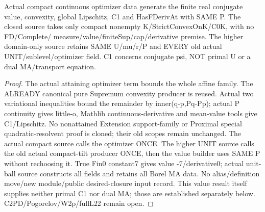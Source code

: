 \begin{lemma}
  \label{lem:compact-conjugate-value}
  \leanok
  Actual compact continuous optimizer data generate the finite real conjugate
  value, convexity, global Lipschitz, C1 and HasFDerivAt with SAME P. The closed
  source takes only compact nonempty K/StrictConvexOnK/C0K, with no FD/Complete/
  measure/value/finiteSup/cap/derivative premise. The higher domain-only source
  retains SAME U/mu/r/P and EVERY old actual UNIT/sublevel/optimizer field.
  C1 concerns conjugate psi, NOT primal U or a dual MA/transport equation.
\end{lemma}
\begin{proof}
  \leanok
  The actual attaining optimizer term bounds the whole affine family. The
  ALREADY canonical pure Supremum convexity producer is reused. Actual two
  variational inequalities bound the remainder by inner(q-p,Pq-Pp); actual P
  continuity gives little-o, Mathlib continuous-derivative and mean-value tools
  give C1/Lipschitz. No nonattained Extension support-family or Proximal special
  quadratic-resolvent proof is cloned; their old scopes remain unchanged.
  The actual compact source calls the optimizer ONCE. The higher UNIT source
  calls the old actual compact-tilt producer ONCE, then the value builder uses
  SAME P without rechoosing it. True Fin0 constant7 gives value -7/derivative0;
  actual unit-ball source constructs all fields and retains all Borel MA data.
  No alias/definition move/new module/public desired-closure input record.
  This value result itself supplies neither primal C1 nor dual MA; those
  are established separately below. C2PD/Pogorelov/W2p/fullL22 remain open.
\end{proof}



